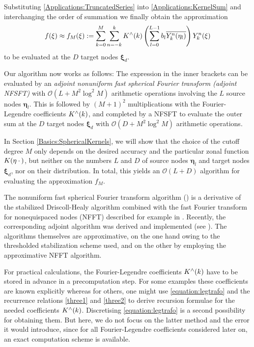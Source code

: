 \documentclass[11pt,a4paper,twoside,bibtotoc]{scrartcl}
\theoremstyle{plain}
\theoremstyle{definition}
\theoremstyle{remark}
\newcommand{\fun}[2]{\ensuremath{#1{\hspace{-0.4ex}}\left(#2\right)}}
\newcommand{\paren}[1]{\ensuremath{\left(#1\right)}}
\newcommand{\bigo}[1]{\ensuremath{\mathcal{O}\paren{#1}}}
\newcommand{\mb}[1]{\mathbf{#1}}
\newcommand{\V}[1]{\mb{#1}}
\numberwithin{equation}{section}
\numberwithin{table}{section}
\numberwithin{figure}{section}
\begin{document}
Substituting \eqref{Applications:TruncatedSeries} into
\eqref{Applications:KernelSum} and interchanging the order of summation we
finally obtain the approximation
\[
  \fun{f}{\V{\xi}} \approx \fun{f_{M}}{\V{\xi}} := \sum_{k=0}^{M} \sum_{n=-k}^k \fun{K^{\wedge}}{k}
  \paren{\sum_{l = 0}^{L-1} b_{l} \overline{\fun{Y_{k}^n}{\V{\eta}_{l}}}}
  \fun{Y_{k}^n}{\V{\xi}}
\]
to be evaluated at the $D$ target nodes $\V{\xi}_{d}$.

Our algorithm now works as follows: The expression in the inner brackets 
can be evaluated by an \emph{adjoint nonuniform fast spherical Fourier 
transform (adjoint NFSFT)} with $\mathcal{O}(L + M^2 \log^2 M)$ arithmetic 
operations involving the $L$ source nodes $\V{\eta}_{l}$. This is followed 
by $(M+1)^2$ multiplications with the Fourier-Legendre coefficients 
$\fun{K^{\wedge}}{k}$, and completed by a NFSFT to evaluate the
outer sum at the $D$ target nodes $\V{\xi}_{d}$ with $\mathcal{O}(D + M^2 \log^2
M)$ arithmetic operations.

In Section \ref{Basics:SphericalKernels}, we will show that the choice 
of the cutoff degree $M$ only depends on the desired accuracy
and the particular zonal function $\fun{K}{\V{\eta} \: \cdot \,}$, but neither
on the numbers $L$ and $D$ of source nodes $\V{\eta}_{l}$ and target nodes 
$\V{\xi}_{d}$, nor on their distribution.
In total, this yields an $\bigo{L + D}$ algorithm for evaluating the 
approximation $f_{M}$.

The nonuniform fast spherical Fourier transform algorithm (\cite{kupo02}) is 
a derivative of the stabilized Driscoll-Healy algorithm \cite{drhe,postta97}
combined with the fast Fourier transform for nonequispaced nodes (NFFT)
described for example in \cite{postta01}. Recently, the corresponding adjoint 
algorithm was derived and implemented (see \cite{keiner05}). The algorithms 
themselves are approximative, on the one hand owing to the thresholded stabilization scheme used, and on the other by employing the approximative
NFFT algorithm.

For practical calculations, the Fourier-Legendre coefficients 
$\fun{K^{\wedge}}{k}$ have to be stored in advance in a precomputation step. 
For some examples these coefficients are known explicitly whereas for others, one might use \eqref{equation:legtrafo}
and the recurrence relations \eqref{three1} and \eqref{three2} to derive
recursion formulae for the needed coefficients $\fun{K^{\wedge}}{k}$.
Discretising \eqref{equation:legtrafo} is a second possibility for obtaining them.
But here, we do not focus on the latter method and the error it would introduce, since for all Fourier-Legendre coefficients considered later on, an exact computation scheme is available.
\end{document}
